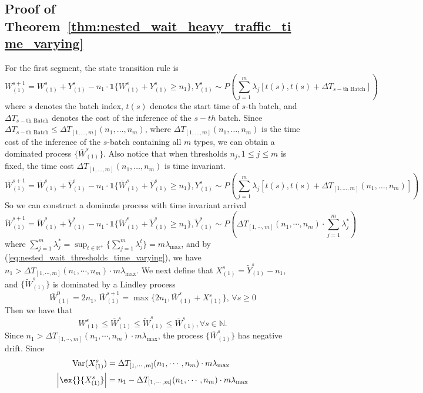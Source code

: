 \subsection{Proof of Theorem~\ref{thm:nested_wait_heavy_traffic_time_varying}}\label{appendix:: proof of nested optimality, time varying.}
For the first segment, the state transition rule is 
$$ W_{(1)}^{s+1} = W_{(1)}^{s} + Y_{(1)}^s  - n_1 \cdot \mathbf{1}\{ W_{(1)}^{s} + Y_{(1)}^s \geq n_1 \},  Y_{(1)}^s \sim P( \sum_{j=1}^m \lambda_j[t(s), t(s)+ \Delta T_{s-\text{th Batch}}] )  $$
where $s$ denotes the batch index, $t(s)$ denotes the start time of $s$-th batch, and $\Delta T_{s-\text{th Batch}}$ denotes the cost of the inference of the $s-th$ batch. Since $\Delta T_{s-\text{th Batch}}\leq \Delta T_{[1,\dots,m]}(n_1,\dots,n_m)$, where $\Delta T_{[1,\dots,m]}(n_1,\dots,n_m)$ is the time cost of the inference of the $s$-batch containing all $m$ types, we can obtain a dominated process $\{\bar{W}_{(1)}^{s}\}$. Also notice that when thresholds $n_j, 1\leq j\leq m$ is fixed, the time cost $\Delta T_{[1,\dots,m]}(n_1,\dots,n_m)$ is time invariant.
$$ \bar{W}_{(1)}^{s+1} = \bar{W}_{(1)}^{s} + \bar{Y}_{(1)}^s  - n_1 \cdot \mathbf{1}\{ \bar{W}_{(1)}^{s} + \bar{Y}_{(1)}^s \geq n_1 \},  Y_{(1)}^s \sim P(  \sum_{j=1}^m \lambda_j[t(s), t(s)+\Delta T_{[1,\dots,m]}(n_1,\dots,n_m)] )  $$
So we can construct a dominate process with time invariant arrival
$$ \tilde{W}_{(1)}^{s+1} = \tilde{W}_{(1)}^{s} + \tilde{Y}_{(1)}^s  - n_1 \cdot \mathbf{1}\{ \tilde{W}_{(1)}^{s} + \tilde{Y}_{(1)}^s \geq n_1 \},  \tilde{Y}_{(1)}^s \sim P( \Delta T_{ [1,\cdots,m]}(n_1,\cdots,n_m)\cdot \sum_{j=1}^m \lambda_j^* )  $$
where $ \sum_{j=1}^m \lambda_j^*  = \sup_{t \in \mathbb{R}^+} \{  \sum_{j=1}^m \lambda_j^t\} =m\lambda_{\max} $, and by (\ref{eq:nested_wait_thresholds_time_varying}), we have $n_1>  \Delta T_{ [1,\cdots,m]}(n_1,\cdots,n_m)\cdot m \lambda_{\max}$. We next define that $X_{(1)}^s = \tilde{Y}_{(1)}^s - n_1  $, and $\{ \tilde{W}_{(1)}^{s}\}$ is dominated by a Lindley process
$$ \overline{W}_{(1)}^{0} = 2n_1,\,  \overline{W}_{(1)}^{s+1} = \max \{  2n_1, \overline{W}_{(1)}^{s} + X_{(1)}^s \},\,\forall s\geq 0  $$
Then we have that
$$ W_{(1)}^{s}\leq \bar{W}_{(1)}^{s} \leq \tilde{W}_{(1)}^{s} \leq \overline{W}_{(1)}^{s}, \forall s \in \mathbb{N}.$$
Since $n_1>  \Delta T_{ [1,\cdots,m]}(n_1,\cdots,n_m)\cdot m \lambda_{\max}$, the process $\{\overline{W}_{(1)}^{s} \}$ has negative drift. Since 
\begin{align*}
    \text{Var}(X_{(1)}^s ) &= \Delta T_{ [1,\cdots,m]}(n_1,\cdots,n_m)\cdot m\lambda_{\max}\\
    \left|  \ex{}{X_{(1)}^s} \right| &= n_1 - \Delta T_{ [1,\cdots,m]}(n_1,\cdots,n_m)\cdot m \lambda_{\max}
\end{align*}
